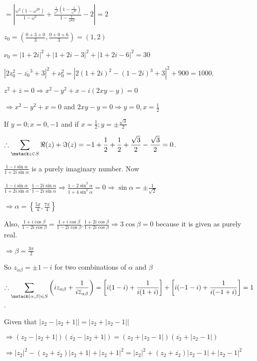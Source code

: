   $= \left|\frac{\omega^2(1 - \omega^{20})}{1 - \omega^2} + \frac{\frac{1}{\omega^2}\left(1 -
    \frac{1}{\omega^{30}}\right)}{1 - \frac{1}{\omega62}} -2\right|= 2$
\item $z_0 = \left(\frac{0 + 3 + 0}{3}, \frac{0 + 0 + 6}{3}\right) = (1, 2)$

  $\nu_0 = |1 + 2i|^2 + |1 + 2i - 3|^2 + |1 + 2i - 6|^2 = 30$

  $|2z_0^2 - \overline{z_0}^3 + 3|^2 + \nu_0^2 = |2(1 + 2i)^2 - (1 - 2i)^3 + 3|^2 + 900 = 1000$.
\item $z^2 + \overline{z} = 0 \Rightarrow x^2 - y^2 + x - i(2xy - y) = 0$

  $\Rightarrow x^2 - y^2 + x = 0$ and $2xy - y = 0 \Rightarrow y = 0, x = \frac{1}{2}$

  If $y = 0; x = 0, -1$ and if $x = \frac{1}{2}; y = \pm\frac{\sqrt{3}}{2}$

  $\therefore \displaystyle\sum_{\mstack z\in S}\Re(z) + \Im(z) = -1 + \frac{1}{2} + \frac{1}{2} +
  \frac{\sqrt{3}}{2} - \frac{\sqrt{3}}{2} = 0$.
\item $\frac{1 - i\sin\alpha}{1 + 2i\sin\alpha}$ is a purely imaginary number. Now

  $\frac{1 - i\sin\alpha}{1 + 2i\sin\alpha}.\frac{1 - 2i\sin\alpha}{1 - 2i\sin\alpha} \Rightarrow \frac{1 -
  2\sin^2\alpha}{1 + 4\sin^2\alpha} = 0 \Rightarrow \sin\alpha= \pm\frac{1}{\sqrt{2}}$

  $\Rightarrow \alpha = \left\{\frac{5\pi}{4}, \frac{7\pi}{4}\right\}$

  Also, $\frac{1 + i\cos\beta}{1 - 2i\cos\beta} = \frac{1 + i\cos\beta}{1 - 2i\cos\beta}.\frac{1 +
    2i\cos\beta}{1 + 2i\cos\beta} \Rightarrow 3\cos\beta = 0$ because it is given as purely real.

  $\Rightarrow \beta = \frac{3\pi}{2}$

  So $z_{\alpha\beta} = \pm 1 - i$ for two combinations of $\alpha$ and $\beta$

  $\therefore \displaystyle\sum_{\mstack (\alpha, \beta)\in S}\left(iz_{\alpha\beta} +
  \frac{1}{i\overline{z}_{\alpha\beta}}\right) = \left[i(1 - i) + \frac{1}{i(1 + i)}\right] + \left[i(-1 -
    i) + \frac{1}{i(-1 + i)}\right] = 1$.
\item Given that $\bigl|z_2 - |z_2 + 1|\bigr| = \bigl|z_2 + |z_2 - 1|\bigr|$

  $\Rightarrow (z_2 - |z_2 + 1|)(\overline{z_2} - |z_2 + 1|) = (z_2 + |z_2 - 1|)(\overline{z_2} + |z_2 -
  1|)$

  $\Rightarrow |z_2|^2 - (z_2 + \overline{z_2})|z_2 + 1| + |z_2 + 1|^2 = |z_2|^2 + (z_2 +
  \overline{z_2})|z_2 - 1| + |z_2 - 1|^2$

